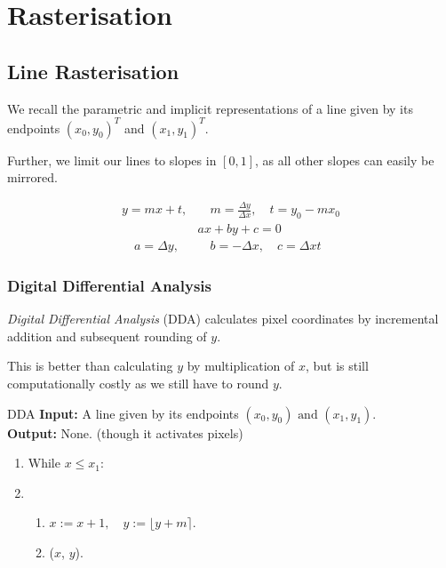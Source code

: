 \documentclass[english]{panikzettel}
\begin{document}
\section{Rasterisation}

\subsection{Line Rasterisation}

\begin{halfboxl}
We recall the parametric and implicit representations of a line given by its endpoints $(x_0,y_0)^T$ and $(x_1,y_1)^T$.

Further, we limit our lines to slopes in $[0,1]$, as all other slopes can easily be mirrored.

\end{halfboxl}%
\begin{halfboxr}
\vspace{-\baselineskip}
\begin{align*}
    y = mx + t, & \quad m = \frac{\Delta y}{\Delta x}, \quad t = y_0 - mx_0  \\
    & ax + by + c = 0 \\
    \quad a = \Delta y, & \quad b =-\Delta x, \quad c = \Delta x t
\end{align*}
\end{halfboxr}


\begin{halfboxl}
\vspace{-\baselineskip}
\subsubsection*{Digital Differential Analysis}

\emph{Digital Differential Analysis} (DDA) calculates pixel coordinates by incremental addition and subsequent rounding of $y$.

This is better than calculating $y$ by multiplication of $x$, but is still computationally costly as we still have to round $y$.
\end{halfboxl}%
\begin{halfboxr}
\vspace{-\baselineskip}
\begin{algo}{DDA}
\textbf{Input:} A line given by its endpoints $(x_0,y_0) \text{ and } (x_1,y_1)$. \\
\textbf{Output:} None. (though it activates pixels)
\tcblower
\begin{enumerate}
    \item While $x \le x_1$:
    \item   \begin{enumerate}
                \item $x := x + 1, \quad y := \lfloor y + m \rceil$.
                \item {}($x$, $y$).
            \end{enumerate}
\end{enumerate}
\end{algo}
\end{halfboxr}
\end{document}
